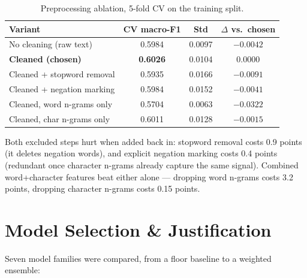 \documentclass[11pt,a4paper]{article}
\begin{document}
\begin{table}[H]
\centering
\small
\begin{tabular}{@{}lccc@{}}
\toprule
\textbf{Variant} & \textbf{CV macro-F1} & \textbf{Std} & \textbf{$\Delta$ vs.\ chosen} \\
\midrule
No cleaning (raw text) & 0.5984 & 0.0097 & $-0.0042$ \\
\textbf{Cleaned (chosen)} & \textbf{0.6026} & 0.0104 & 0.0000 \\
Cleaned + stopword removal & 0.5935 & 0.0166 & $-0.0091$ \\
Cleaned + negation marking & 0.5984 & 0.0152 & $-0.0041$ \\
Cleaned, word n-grams only & 0.5704 & 0.0063 & $-0.0322$ \\
Cleaned, char n-grams only & 0.6011 & 0.0128 & $-0.0015$ \\
\bottomrule
\end{tabular}
\caption{Preprocessing ablation, 5-fold CV on the training split.}
\end{table}

\begin{insightbox}
Both excluded steps hurt when added back in: stopword removal costs 0.9 points (it deletes negation words), and explicit negation marking costs 0.4 points (redundant once character n-grams already capture the same signal). Combined word+character features beat either alone --- dropping word n-grams costs 3.2 points, dropping character n-grams costs 0.15 points.
\end{insightbox}

\section{Model Selection \& Justification}
\label{sec:model-selection}

Seven model families were compared, from a floor baseline to a weighted ensemble:
\end{document}
